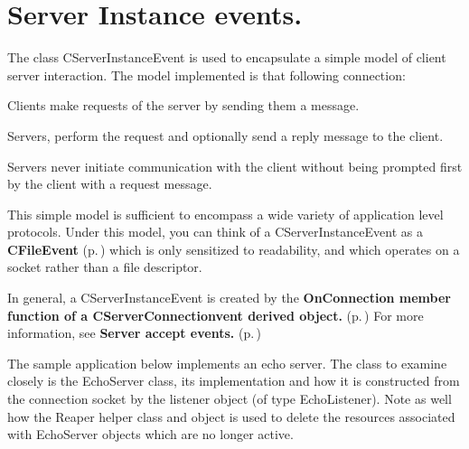 \section{Server Instance events.}\label{SocketEvents}


The class CServer\-Instance\-Event is used to encapsulate a simple model of client server interaction. The model implemented is that following connection:\begin{CompactItemize}
\item 
Clients make requests of the server by sending them a message.\item 
Servers, perform the request and optionally send a reply message to the client.\item 
Servers never initiate communication with the client without being prompted first by the client with a request message.\end{CompactItemize}
This simple model is sufficient to encompass a wide variety of application level protocols. Under this model, you can think of a CServer\-Instance\-Event as a {\bf CFile\-Event} {\rm (p.\,\pageref{classCFileEvent})} which is only sensitized to readability, and which operates on a  socket rather than a file descriptor.

In general, a CServer\-Instance\-Event is created by the  {\bf On\-Connection member function of a CServer\-Connectionvent derived object.} {\rm (p.\,\pageref{classCServerConnectionEvent_a12})} For more information, see {\bf Server accept events.} {\rm (p.\,\pageref{ServerEvent})}

The sample application below implements an echo server. The class to examine closely is the Echo\-Server class, its implementation and how it is constructed from the connection socket by the listener object (of type Echo\-Listener). Note as well how the Reaper helper class and object is used to delete the resources associated with Echo\-Server objects which are no longer active.



